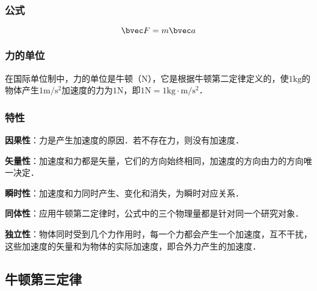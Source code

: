 \subsubsection{公式}
\begin{equation}
\bvec F=m\bvec a
\end{equation}

\subsubsection{力的单位}
在国际单位制中，力的单位是牛顿（$\mathrm N$），它是根据牛顿第二定律定义的，使$1\mathrm{kg}$的物体产生$1\mathrm{m/s^2}$加速度的力为$1\mathrm N$，即$1\mathrm N=1\mathrm{kg \cdot m/s^2}$．

\subsubsection{特性}
\textbf{因果性}：力是产生加速度的原因．若不存在力，则没有加速度．

\textbf{矢量性}：加速度和力都是矢量，它们的方向始终相同，加速度的方向由力的方向唯一决定．

\textbf{瞬时性}：加速度和力同时产生、变化和消失，为瞬时对应关系．

\textbf{同体性}：应用牛顿第二定律时，公式中的三个物理量都是针对同一个研究对象．

\textbf{独立性}：物体同时受到几个力作用时，每一个力都会产生一个加速度，互不干扰，这些加速度的矢量和为物体的实际加速度，即合外力产生的加速度．

\subsection{牛顿第三定律}